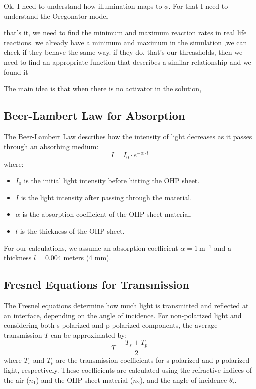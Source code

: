 Ok, I need to understand how illumination maps to $\phi$. For that I need to understand the Oregonator model


that's it, we need to find the minimum and maximum reaction rates in real life reactions. 
we already have a minimum and maximum in the simulation ,we can check if they behave the same way. if they do, that's our threasholds, then we need to find an appropriate function that describes a similar relationship and we found it


The main idea is that when there is no activator in the solution,  \citep{reddy1995effect}



\subsection*{Beer-Lambert Law for Absorption}
The Beer-Lambert Law describes how the intensity of light decreases as it passes through an absorbing medium:
\[ I = I_0 \cdot e^{-\alpha \cdot l} \]
where:
\begin{itemize}
    \item \(I_0\) is the initial light intensity before hitting the OHP sheet.
    \item \(I\) is the light intensity after passing through the material.
    \item \(\alpha\) is the absorption coefficient of the OHP sheet material.
    \item \(l\) is the thickness of the OHP sheet.
\end{itemize}

For our calculations, we assume an absorption coefficient \(\alpha = 1\ \text{m}^{-1}\) and a thickness \(l = 0.004\) meters (4 mm).

\subsection*{Fresnel Equations for Transmission}
The Fresnel equations determine how much light is transmitted and reflected at an interface, depending on the angle of incidence. For non-polarized light and considering both s-polarized and p-polarized components, the average transmission \(T\) can be approximated by:
\[ T = \frac{T_s + T_p}{2} \]
where \(T_s\) and \(T_p\) are the transmission coefficients for s-polarized and p-polarized light, respectively. These coefficients are calculated using the refractive indices of the air (\(n_1\)) and the OHP sheet material (\(n_2\)), and the angle of incidence \(\theta_i\).


